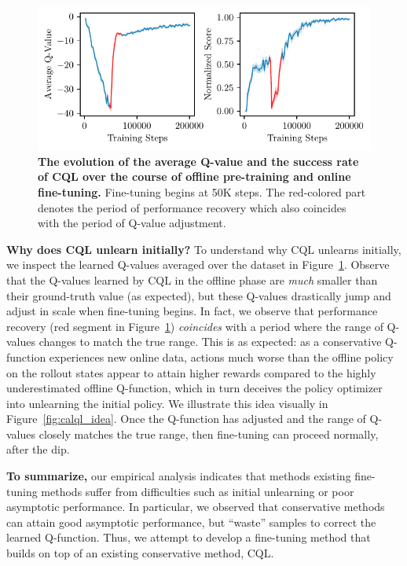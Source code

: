 \begin{figure}
\vspace{-0.5cm}
\begin{center}
\centerline{\includegraphics[width=0.99\linewidth]{chapters/cal_ql/figs-sample/CQL-q-values.pdf}}
\vspace{-0.25cm}
\caption{\label{fig:cql_q_value} \footnotesize{\textbf{The evolution of the average Q-value and the success rate of CQL over the course of offline pre-training and online fine-tuning.} Fine-tuning begins at 50K steps. The red-colored part denotes the period of performance recovery which also coincides with the period of Q-value adjustment.}}
\end{center}
\vspace{-0.9cm}
\end{figure}
\textbf{Why does CQL unlearn initially?} To understand why CQL unlearns initially, we inspect the learned Q-values averaged over the dataset in Figure~\ref{fig:cql_q_value}. Observe that the Q-values learned by CQL in the offline phase are \emph{much} smaller than their ground-truth value (as expected), but these Q-values drastically jump and adjust in scale when fine-tuning begins. In fact, we observe that performance recovery (red segment in Figure~\ref{fig:cql_q_value}) {\em coincides} with a period where the range of Q-values changes to match the true range. This is as expected: as a conservative Q-function experiences new online data, actions much worse than the offline policy on the rollout states appear to attain higher rewards compared to the highly underestimated offline Q-function, which in turn deceives the policy optimizer into unlearning the initial policy. We illustrate this idea visually in Figure~\ref{fig:calql_idea}. Once the Q-function has adjusted and the range of Q-values closely matches the true range, then fine-tuning can proceed normally, after the dip. 

\textbf{To summarize,} our empirical analysis indicates that methods existing fine-tuning methods suffer from difficulties such as initial unlearning or poor asymptotic performance. In particular, we observed that conservative methods can attain good asymptotic performance, but ``waste'' samples to correct the learned Q-function. Thus, we attempt to develop a fine-tuning method that builds on top of an existing conservative method, CQL. 


